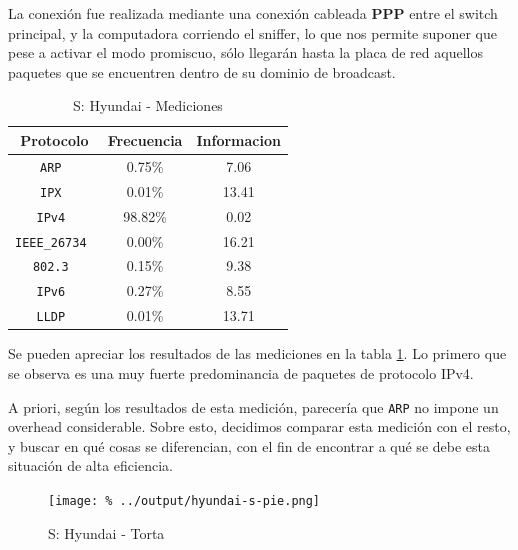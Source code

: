 \documentclass[final,inline,a4paper,narroweqnarray]{ieee}
\begin{document}
    La conexión fue realizada mediante una conexión cableada
    \textbf{PPP} entre el switch principal, y la computadora corriendo
    el sniffer, lo que nos permite suponer que pese a activar el modo
    promiscuo, sólo llegarán hasta la placa de red aquellos paquetes
    que se encuentren dentro de su dominio de broadcast.

    \begin{table}\begin{center}
      \begin{tabular}{|c|c|c|}
      \hline
      \textbf{Protocolo}   & \textbf{Frecuencia} & \textbf{Informacion}\\ \hline
      \texttt{ARP         }& 0.75\%     & 7.06       \\ \hline
      \texttt{IPX         }& 0.01\%     & 13.41      \\ \hline
      \texttt{IPv4        }& 98.82\%    & 0.02       \\ \hline
      \texttt{IEEE\_26734 }& 0.00\%     & 16.21      \\ \hline
      \texttt{802.3       }& 0.15\%     & 9.38       \\ \hline
      \texttt{IPv6        }& 0.27\%     & 8.55       \\ \hline
      \texttt{LLDP        }& 0.01\%     & 13.71      \\ \hline
      \end{tabular}
      \caption{S: Hyundai - Mediciones}
      \label{hyundai-s-table}
    \end{center}\end{table}

    Se pueden apreciar los resultados de las mediciones en la tabla
    \ref{hyundai-s-table}. Lo primero que se observa es una muy fuerte
    predominancia de paquetes de protocolo IPv4.

    A priori, según los resultados de esta medición, parecería que
    \texttt{ARP} no impone un overhead considerable. Sobre esto,
    decidimos comparar esta medición con el resto, y buscar en qué
    cosas se diferencian, con el fin de encontrar a qué se debe esta
    situación de alta eficiencia.

    \begin{figure}[h]\begin{center}
      \texttt{[image: \%
      ../output/hyundai-s-pie.png]}
      \vspace{-3em}
      \caption{S: Hyundai - Torta}
      \label{hyundai-s-pie}
    \end{center}\end{figure}
\end{document}
